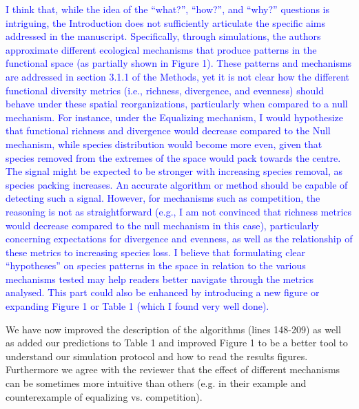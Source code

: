 \documentclass[
]{article}
\begin{document}
\textcolor{blue}{I think that, while the idea of the ``what?'', ``how?'', and ``why?'' questions is intriguing, the Introduction does not sufficiently articulate the specific aims addressed in the manuscript.
Specifically, through simulations, the authors approximate different ecological mechanisms that produce patterns in the functional space (as partially shown in Figure 1).
These patterns and mechanisms are addressed in section 3.1.1 of the Methods, yet it is not clear how the different functional diversity metrics (i.e., richness, divergence, and evenness) should behave under these spatial reorganizations, particularly when compared to a null mechanism.
For instance, under the Equalizing mechanism, I would hypothesize that functional richness and divergence would decrease compared to the Null mechanism, while species distribution would become more even, given that species removed from the extremes of the space would pack towards the centre.
The signal might be expected to be stronger with increasing species removal, as species packing increases.
An accurate algorithm or method should be capable of detecting such a signal.
However, for mechanisms such as competition, the reasoning is not as straightforward (e.g., I am not convinced that richness metrics would decrease compared to the null mechanism in this case), particularly concerning expectations for divergence and evenness, as well as the relationship of these metrics to increasing species loss.
I believe that formulating clear ``hypotheses'' on species patterns in the space in relation to the various mechanisms tested may help readers better navigate through the metrics analysed.
This part could also be enhanced by introducing a new figure or expanding Figure 1 or Table 1 (which I found very well done).}

We have now improved the description of the algorithms (lines 148-209) as well as added our predictions to Table 1 and improved Figure 1 to be a better tool to understand our simulation protocol and how to read the results figures.
Furthermore we agree with the reviewer that the effect of different mechanisms can be sometimes more intuitive than others (e.g. in their example and counterexample of equalizing vs. competition).
\end{document}
